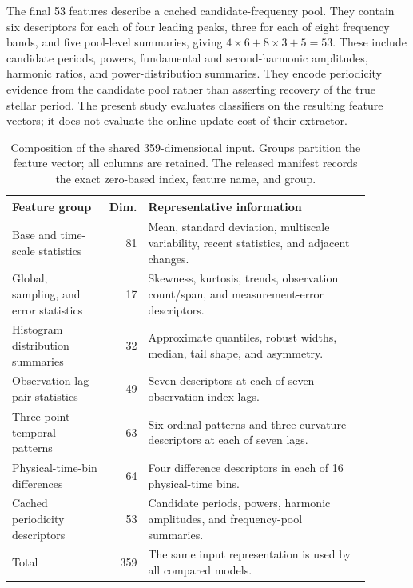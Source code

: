 \documentclass[aps,a4paper,onecolumn,11pt,unpublished]{quantumarticle}
\begin{document}
The final 53 features describe a cached candidate-frequency pool. They contain six descriptors for each of four leading peaks, three for each of eight frequency bands, and five pool-level summaries, giving $4\times6+8\times3+5=53$. These include candidate periods, powers, fundamental and second-harmonic amplitudes, harmonic ratios, and power-distribution summaries. They encode periodicity evidence from the candidate pool rather than asserting recovery of the true stellar period. The present study evaluates classifiers on the resulting feature vectors; it does not evaluate the online update cost of their extractor.

\begin{table}[htbp]
\centering
\small
\setlength{\tabcolsep}{4pt}
\caption{Composition of the shared 359-dimensional input. Groups partition the feature vector; all columns are retained. The released manifest records the exact zero-based index, feature name, and group.}
\label{tab:featuregroups}
\begin{tabular}{@{}>{\raggedright\arraybackslash}p{0.27\linewidth}r>{\raggedright\arraybackslash}p{0.62\linewidth}@{}}
\toprule
Feature group & Dim. & Representative information \\
\midrule
Base and time-scale statistics & 81 & Mean, standard deviation, multiscale variability, recent statistics, and adjacent changes. \\
Global, sampling, and error statistics & 17 & Skewness, kurtosis, trends, observation count/span, and measurement-error descriptors. \\
Histogram distribution summaries & 32 & Approximate quantiles, robust widths, median, tail shape, and asymmetry. \\
Observation-lag pair statistics & 49 & Seven descriptors at each of seven observation-index lags. \\
Three-point temporal patterns & 63 & Six ordinal patterns and three curvature descriptors at each of seven lags. \\
Physical-time-bin differences & 64 & Four difference descriptors in each of 16 physical-time bins. \\
Cached periodicity descriptors & 53 & Candidate periods, powers, harmonic amplitudes, and frequency-pool summaries. \\
\midrule
Total & 359 & The same input representation is used by all compared models. \\
\bottomrule
\end{tabular}
\end{table}
\end{document}
